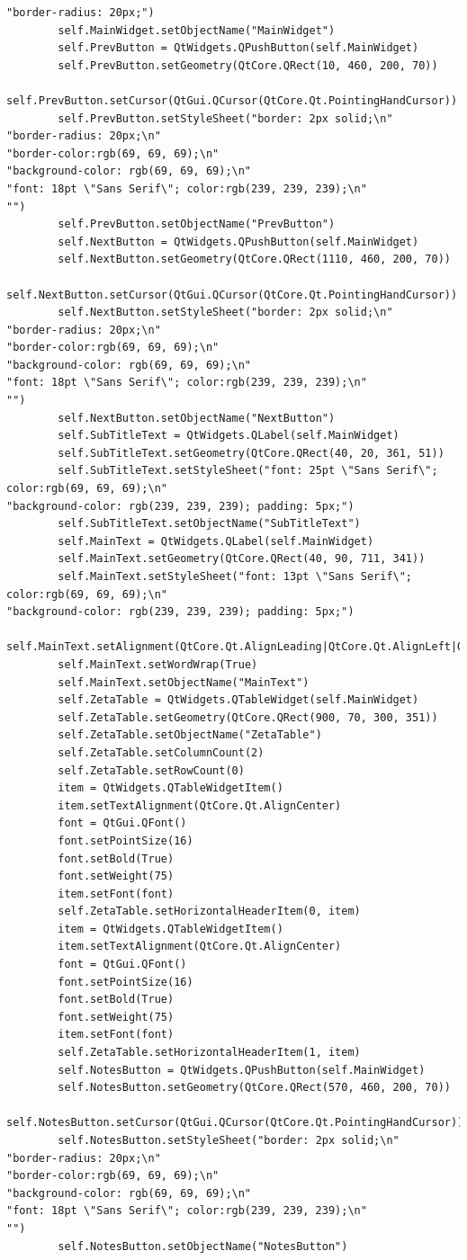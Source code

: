 \documentclass[12pt]{article}
\begin{document}
\begin{lstlisting}
"border-radius: 20px;")
        self.MainWidget.setObjectName("MainWidget")
        self.PrevButton = QtWidgets.QPushButton(self.MainWidget)
        self.PrevButton.setGeometry(QtCore.QRect(10, 460, 200, 70))
        self.PrevButton.setCursor(QtGui.QCursor(QtCore.Qt.PointingHandCursor))
        self.PrevButton.setStyleSheet("border: 2px solid;\n"
"border-radius: 20px;\n"
"border-color:rgb(69, 69, 69);\n"
"background-color: rgb(69, 69, 69);\n"
"font: 18pt \"Sans Serif\"; color:rgb(239, 239, 239);\n"
"")
        self.PrevButton.setObjectName("PrevButton")
        self.NextButton = QtWidgets.QPushButton(self.MainWidget)
        self.NextButton.setGeometry(QtCore.QRect(1110, 460, 200, 70))
        self.NextButton.setCursor(QtGui.QCursor(QtCore.Qt.PointingHandCursor))
        self.NextButton.setStyleSheet("border: 2px solid;\n"
"border-radius: 20px;\n"
"border-color:rgb(69, 69, 69);\n"
"background-color: rgb(69, 69, 69);\n"
"font: 18pt \"Sans Serif\"; color:rgb(239, 239, 239);\n"
"")
        self.NextButton.setObjectName("NextButton")
        self.SubTitleText = QtWidgets.QLabel(self.MainWidget)
        self.SubTitleText.setGeometry(QtCore.QRect(40, 20, 361, 51))
        self.SubTitleText.setStyleSheet("font: 25pt \"Sans Serif\"; color:rgb(69, 69, 69);\n"
"background-color: rgb(239, 239, 239); padding: 5px;")
        self.SubTitleText.setObjectName("SubTitleText")
        self.MainText = QtWidgets.QLabel(self.MainWidget)
        self.MainText.setGeometry(QtCore.QRect(40, 90, 711, 341))
        self.MainText.setStyleSheet("font: 13pt \"Sans Serif\"; color:rgb(69, 69, 69);\n"
"background-color: rgb(239, 239, 239); padding: 5px;")
        self.MainText.setAlignment(QtCore.Qt.AlignLeading|QtCore.Qt.AlignLeft|QtCore.Qt.AlignTop)
        self.MainText.setWordWrap(True)
        self.MainText.setObjectName("MainText")
        self.ZetaTable = QtWidgets.QTableWidget(self.MainWidget)
        self.ZetaTable.setGeometry(QtCore.QRect(900, 70, 300, 351))
        self.ZetaTable.setObjectName("ZetaTable")
        self.ZetaTable.setColumnCount(2)
        self.ZetaTable.setRowCount(0)
        item = QtWidgets.QTableWidgetItem()
        item.setTextAlignment(QtCore.Qt.AlignCenter)
        font = QtGui.QFont()
        font.setPointSize(16)
        font.setBold(True)
        font.setWeight(75)
        item.setFont(font)
        self.ZetaTable.setHorizontalHeaderItem(0, item)
        item = QtWidgets.QTableWidgetItem()
        item.setTextAlignment(QtCore.Qt.AlignCenter)
        font = QtGui.QFont()
        font.setPointSize(16)
        font.setBold(True)
        font.setWeight(75)
        item.setFont(font)
        self.ZetaTable.setHorizontalHeaderItem(1, item)
        self.NotesButton = QtWidgets.QPushButton(self.MainWidget)
        self.NotesButton.setGeometry(QtCore.QRect(570, 460, 200, 70))
        self.NotesButton.setCursor(QtGui.QCursor(QtCore.Qt.PointingHandCursor))
        self.NotesButton.setStyleSheet("border: 2px solid;\n"
"border-radius: 20px;\n"
"border-color:rgb(69, 69, 69);\n"
"background-color: rgb(69, 69, 69);\n"
"font: 18pt \"Sans Serif\"; color:rgb(239, 239, 239);\n"
"")
        self.NotesButton.setObjectName("NotesButton")


\end{lstlisting}
\end{document}
